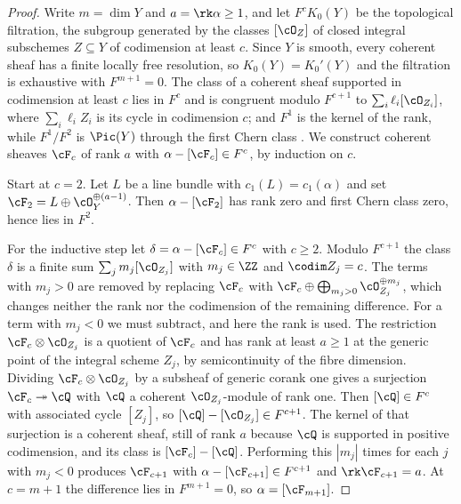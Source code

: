 \begin{proof}
Write $m=\dim Y$ and $a=\rk\alpha\ge1$, and let $F^{c}K_{0}(Y)$ be the
topological filtration, the subgroup generated by the classes $[\cO_{Z}]$ of
closed integral subschemes $Z\subseteq Y$ of codimension at least $c$. Since
$Y$ is smooth, every coherent sheaf has a finite locally free resolution, so
$K_{0}(Y)=K_{0}'(Y)$ and the filtration is exhaustive with $F^{m+1}=0$.
The class of a coherent sheaf supported in codimension at least $c$
lies in $F^{c}$ and is congruent modulo $F^{c+1}$ to
$\sum_{i}\ell_{i}[\cO_{Z_{i}}]$, where $\sum_{i}\ell_{i}Z_{i}$ is its cycle in
codimension $c$; and $F^{1}$ is the kernel of the rank, while $F^{1}/F^{2}$ is
$\Pic(Y)$ through the first Chern class \cite[\S 15.1 and
Ex.~15.1.5]{Ful98}. We construct coherent
sheaves $\cF_{c}$ of rank $a$ with $\alpha-[\cF_{c}]\in F^{c}$, by induction on
$c$.

Start at $c=2$. Let $L$ be a line bundle with $c_{1}(L)=c_{1}(\alpha)$ and set
$\cF_{2}=L\oplus\cO_{Y}^{\oplus(a-1)}$. Then $\alpha-[\cF_{2}]$ has rank zero
and first Chern class zero, hence lies in $F^{2}$.

For the inductive step let $\delta=\alpha-[\cF_{c}]\in F^{c}$ with $c\ge2$.
Modulo $F^{c+1}$ the class $\delta$ is a finite sum $\sum_{j}m_{j}
[\cO_{Z_{j}}]$ with $m_{j}\in\ZZ$ and $\codim Z_{j}=c$. The terms with
$m_{j}>0$ are removed by replacing $\cF_{c}$ with $\cF_{c}\oplus\bigoplus_{
m_{j}>0}\cO_{Z_{j}}^{\oplus m_{j}}$, which changes neither the rank nor the
codimension of the remaining difference. For a term with $m_{j}<0$ we must
subtract, and here the rank is used. The restriction $\cF_{c}\otimes
\cO_{Z_{j}}$ is a quotient of $\cF_{c}$ and has rank at least $a\ge1$ at the
generic point of the integral scheme $Z_{j}$, by semicontinuity of the fibre
dimension. Dividing $\cF_{c}\otimes\cO_{Z_{j}}$ by a subsheaf of generic
corank one gives a surjection $\cF_{c}\twoheadrightarrow\cQ$ with $\cQ$ a
coherent $\cO_{Z_{j}}$-module of rank one. Then $[\cQ]\in F^{c}$ with
associated cycle $[Z_{j}]$, so $[\cQ]-[\cO_{Z_{j}}]\in F^{c+1}$. The kernel of
that surjection is a coherent sheaf, still of rank $a$ because $\cQ$ is
supported in positive codimension, and its class is $[\cF_{c}]-[\cQ]$.
Performing this $|m_{j}|$ times for each $j$ with $m_{j}<0$ produces
$\cF_{c+1}$ with $\alpha-[\cF_{c+1}]\in F^{c+1}$ and $\rk\cF_{c+1}=a$. At
$c=m+1$ the difference lies in $F^{m+1}=0$, so $\alpha=[\cF_{m+1}]$.
\end{proof}

